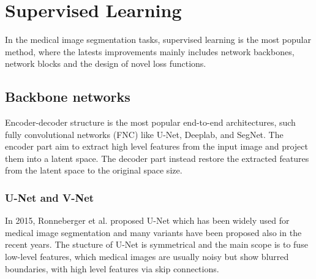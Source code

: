 
\section{Supervised Learning}
In the medical image segmentation tasks, supervised learning is the most popular method, where the latests improvements mainly includes network backbones, network blocks and the design of novel loss functions.

\subsection{Backbone networks}
Encoder-decoder structure is the most popular end-to-end architectures, such
fully convolutional networks (FNC) like U-Net, Deeplab, and SegNet. The encoder
part aim to extract high level features from the input image and project them
into a latent space. The decoder part instead restore the extracted features
from the latent space to the original space size.

\subsubsection{U-Net and V-Net}
In 2015, Ronneberger et al.
proposed U-Net which has been widely used for medical image segmentation and
many variants have been proposed also in the recent years. The stucture of U-Net
is symmetrical and the main scope is to fuse low-level features, which medical
images are usually noisy but show blurred boundaries, with high level features
via skip connections.

